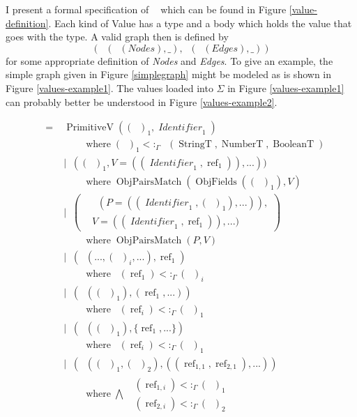 \documentclass[12pt]{article}
\DeclareMathOperator{\StringT}{StringT}
\DeclareMathOperator{\NumberT}{NumberT}
\DeclareMathOperator{\BooleanT}{BooleanT}
\DeclareMathOperator{\RecT}{RecT_\Gamma}
\DeclareMathOperator{\ListT}{ListT_\Gamma}
\DeclareMathOperator{\SetT}{SetT_\Gamma}
\DeclareMathOperator{\MapT}{MapT_\Gamma}
\DeclareMathOperator{\UnionT}{UnionT_\Gamma}
\DeclareMathOperator{\Identifier}{\textit{Identifier}}
\DeclareMathOperator{\Type}{{\textit{Type}_\Gamma}}
\DeclareMathOperator{\Value}{\textit{Value}_{\Gamma, \Sigma}}
\DeclareMathOperator{\PrimitiveV}{PrimitiveV}
\DeclareMathOperator{\RecV}{RecV_{\Gamma, \Sigma}}
\DeclareMathOperator{\ObjV}{ObjV_{\Gamma, \Sigma}}
\DeclareMathOperator{\ListV}{ListV_{\Gamma, \Sigma}}
\DeclareMathOperator{\SetV}{SetV_{\Gamma, \Sigma}}
\DeclareMathOperator{\MapV}{MapV_{\Gamma, \Sigma}}
\DeclareMathOperator{\UnionV}{UnionV_{\Gamma, \Sigma}}
\DeclareMathOperator{\ValueType}{ValueType_{\Gamma, \Sigma}}
\DeclareMathOperator{\textref}{ref}
\DeclareMathOperator{\ObjFields}{ObjFields}
\DeclareMathOperator{\ObjPairsMatch}{ObjPairsMatch}
\DeclareMathOperator{\where}{ where }
\newcommand{\ValueRef}{\textref}
\newcommand{\subtype}{<:_\Gamma}
\begin{document}
I present a formal specification of
\(\Value\) which can be found in Figure \ref{value-definition}.
Each kind of Value has a type and a body which holds the value that 
goes with the type. 
A valid graph then is defined by 
\[(\ListV(\ListT(\textit{Nodes}), \_), \ListV(\ListT(\textit{Edges}), \_))\]
for some appropriate definition of \textit{Nodes} and \textit{Edges}.
To give an example, the simple graph given in Figure \ref{simplegraph} 
might be modeled as is shown in Figure \ref{values-example1}.
The values loaded into \(\Sigma\) in Figure \ref{values-example1} can probably 
better be understood in Figure \ref{values-example2}.

\newcommand{\newlinewhere}{\\&\quad\quad\where}

\begin{figure}
\begin{mdframed}
\begin{align*}
    \Value =& \PrimitiveV((\Type)_1, \Identifier_1) 
    \newlinewhere (\Type)_1 \subtype \UnionT(\StringT, \NumberT, \BooleanT)  \\
    &| \ObjV((\Type)_1, V=((\Identifier_1, \ValueRef_1)), ...)) \newlinewhere
    \ObjPairsMatch(\ObjFields((\Type)_1), V) \\
    &| \RecV\left(\begin{aligned}
        &\RecT(P=((\Identifier_1, (\Type)_1), ...)),\\&V=((\Identifier_1, \ValueRef_1)), ...)
    \end{aligned}\right) \newlinewhere
    \ObjPairsMatch(P, V) \\
    &| \UnionV(\UnionT(..., (\Type)_i, ...), \ValueRef_1) \newlinewhere
    \ValueType(\ValueRef_1) \subtype (\Type)_i\\
    &| \ListV(\ListT((\Type)_1), (\ValueRef_1, ...)) \newlinewhere \ValueType(\ValueRef_i) \subtype (\Type)_1 \\
    &| \SetV(\SetT((\Type)_1), \{\ValueRef_1, ...\}) \newlinewhere \ValueType(\ValueRef_i) \subtype (\Type)_1 \\
    &| \MapV(\MapT((\Type)_1, (\Type)_2), ((\ValueRef_{1,1}, \ValueRef_{2,1}), ...)) \newlinewhere \bigwedge
    \begin{aligned}
        \ValueType(\ValueRef_{1, i}) \subtype (\Type)_1 \\
        \ValueType(\ValueRef_{2, i}) \subtype (\Type)_2 
    \end{aligned}
\end{align*}
\begin{align*}

\end{align*}
\end{mdframed}
\end{figure}
\end{document}
